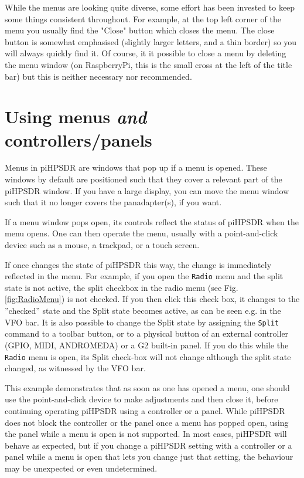 \documentclass[12pt]{book}
\def\bltt#1{\texttt{\color{blue}#1}}
\def\pH{pi\-HPSDR\xspace}
\begin{document}
While the menus are looking quite diverse, some effort has been invested to keep
some things consistent throughout. For example, at the top left corner of the menu
you usually find the "Close" button which closes the menu. The close button is somewhat
emphasised (slightly larger letters, and a thin border) so you will always quickly find it.
Of course, it it possible to close a menu by deleting the menu window (on RaspberryPi,
this is the small cross at the left of the title bar) but this is neither necessary nor
recommended.

\section{Using menus \textit{and} controllers/panels}

Menus in \pH are windows that pop up if a menu is opened. These windows by default are positioned such
that they cover a relevant part of the \pH window. If you have a large display, you can move the menu
window such that it no longer covers the panadapter(s), if you want.

If a menu window pops open, its controls reflect the status of \pH when the menu opens. One can then operate
the menu, usually with a point-and-click device such as a mouse, a trackpad, or a touch screen.

If once changes the state of \pH this way, the change is immediately reflected in the menu. For example,
if you open the \bltt{Radio} menu and the split state is not active, the split checkbox in the radio
menu (see Fig. \ref{fig:RadioMenu}) is not checked. If you then click this check box, it changes to
the ''checked'' state and the Split state becomes active, as can be seen e.g. in the VFO bar. It is also
possible to change the Split state by assigning the \texttt{Split} command to a toolbar button, or to
a physical button of an external controller (GPIO, MIDI, ANDROMEDA) or a G2 built-in panel. If you do this
while the \bltt{Radio} menu is open, its Split check-box will not change although the split state changed,
as witnessed by the VFO bar.

This example demonstrates that as soon as one has opened a menu, one should use the point-and-click device
to make adjustments and then close it, before continuing operating \pH using a controller or a panel. While
\pH does not block the controller or the panel once a menu has popped open, using the panel while a menu
is open is not supported. In most cases, \pH will behave as expected, but
if you change a \pH setting with a controller or a panel while a menu is open that lets you change just
that setting, the behaviour may be unexpected or even undetermined.
\end{document}
